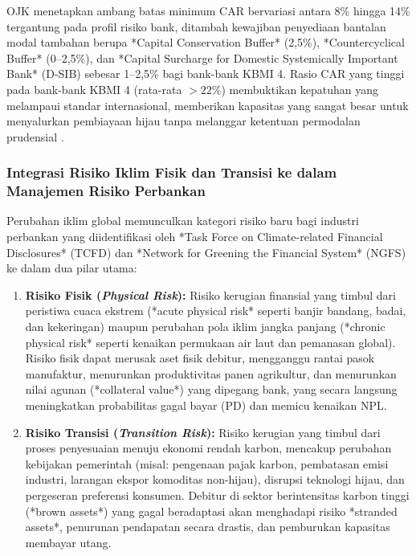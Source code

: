 \documentclass[12pt,a4paper]{article}
\numberwithin{equation}{section}
\begin{document}
\noindent
OJK menetapkan ambang batas minimum CAR bervariasi antara 8\% hingga 14\% tergantung pada profil risiko bank, ditambah kewajiban penyediaan bantalan modal tambahan berupa *Capital Conservation Buffer* (2,5\%), *Countercyclical Buffer* (0--2,5\%), dan *Capital Surcharge for Domestic Systemically Important Bank* (D-SIB) sebesar 1--2,5\% bagi bank-bank KBMI 4. Rasio CAR yang tinggi pada bank-bank KBMI 4 (rata-rata $>22\%$) membuktikan kepatuhan yang melampaui standar internasional, memberikan kapasitas yang sangat besar untuk menyalurkan pembiayaan hijau tanpa melanggar ketentuan permodalan prudensial \citep{BrighamEhrhardt2020, LestariPurnomo2023}.

\subsubsection{Integrasi Risiko Iklim Fisik dan Transisi ke dalam Manajemen Risiko Perbankan}
\noindent
Perubahan iklim global memunculkan kategori risiko baru bagi industri perbankan yang diidentifikasi oleh *Task Force on Climate-related Financial Disclosures* (TCFD) dan *Network for Greening the Financial System* (NGFS) ke dalam dua pilar utama:
\begin{enumerate}
  \item \textbf{Risiko Fisik (\emph{Physical Risk}):} Risiko kerugian finansial yang timbul dari peristiwa cuaca ekstrem (*acute physical risk* seperti banjir bandang, badai, dan kekeringan) maupun perubahan pola iklim jangka panjang (*chronic physical risk* seperti kenaikan permukaan air laut dan pemanasan global). Risiko fisik dapat merusak aset fisik debitur, mengganggu rantai pasok manufaktur, menurunkan produktivitas panen agrikultur, dan menurunkan nilai agunan (*collateral value*) yang dipegang bank, yang secara langsung meningkatkan probabilitas gagal bayar ($\text{PD}$) dan memicu kenaikan NPL.
  \item \textbf{Risiko Transisi (\emph{Transition Risk}):} Risiko kerugian yang timbul dari proses penyesuaian menuju ekonomi rendah karbon, mencakup perubahan kebijakan pemerintah (misal: pengenaan pajak karbon, pembatasan emisi industri, larangan ekspor komoditas non-hijau), disrupsi teknologi hijau, dan pergeseran preferensi konsumen. Debitur di sektor berintensitas karbon tinggi (*brown assets*) yang gagal beradaptasi akan menghadapi risiko *stranded assets*, penurunan pendapatan secara drastis, dan pemburukan kapasitas membayar utang.
\end{enumerate}
\end{document}
